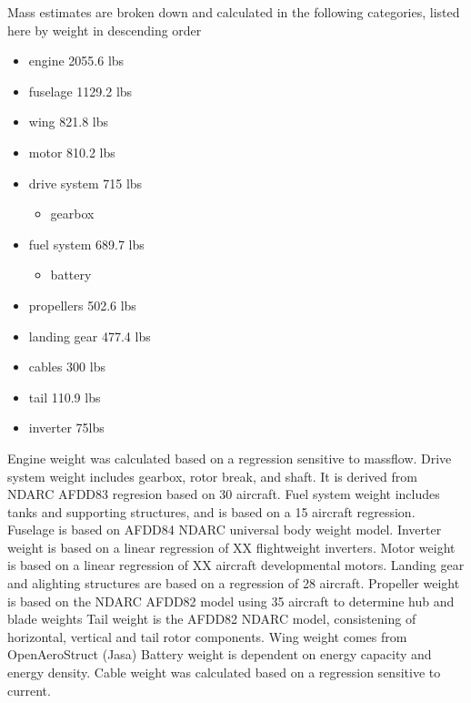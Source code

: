 

Mass estimates are broken down and calculated in the following categories,
listed here by weight in descending order

\begin{itemize}

    \item engine  2055.6 lbs
    \item fuselage 1129.2 lbs
    \item wing 821.8 lbs
    \item motor 810.2 lbs
    \item drive system 715 lbs
        \begin{itemize}
            \item gearbox
        \end{itemize}
    \item fuel system 689.7 lbs
        \begin{itemize}
            \item battery
        \end{itemize}
    \item propellers 502.6 lbs
    \item landing gear 477.4 lbs
    \item cables 300 lbs
    \item tail 110.9 lbs
    \item inverter 75lbs
\end{itemize}

Engine weight was calculated based on a regression sensitive to massflow.
Drive system weight includes gearbox, rotor break, and shaft. It is derived from NDARC AFDD83 regresion based on 30 aircraft.
Fuel system weight includes tanks and supporting structures, and is based on a 15 aircraft regression.
Fuselage is based on AFDD84 NDARC universal body weight model.
Inverter weight is based on a linear regression of XX flightweight inverters.
Motor weight is based on a linear regression of XX aircraft developmental motors.
Landing gear and alighting structures are based on a regression of 28 aircraft.
Propeller weight is based on the NDARC AFDD82 model using 35 aircraft to determine hub and blade weights
Tail weight is the AFDD82 NDARC model, consistening of horizontal, vertical and tail rotor components.
Wing weight comes from OpenAeroStruct (Jasa)
Battery weight is dependent on energy capacity and energy density.
Cable weight was calculated based on a regression sensitive to current.

\cite{NDARC}


